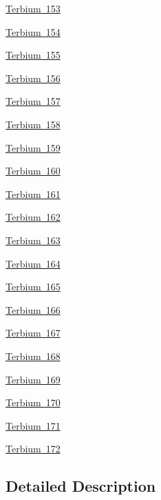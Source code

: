 \begin{DoxyCompactItemize}
\item 
\mbox{\hyperlink{group___isotope_const-_terbium-_tb153}{Terbium 153}}
\item 
\mbox{\hyperlink{group___isotope_const-_terbium-_tb154}{Terbium 154}}
\item 
\mbox{\hyperlink{group___isotope_const-_terbium-_tb155}{Terbium 155}}
\item 
\mbox{\hyperlink{group___isotope_const-_terbium-_tb156}{Terbium 156}}
\item 
\mbox{\hyperlink{group___isotope_const-_terbium-_tb157}{Terbium 157}}
\item 
\mbox{\hyperlink{group___isotope_const-_terbium-_tb158}{Terbium 158}}
\item 
\mbox{\hyperlink{group___isotope_const-_terbium-_tb159}{Terbium 159}}
\item 
\mbox{\hyperlink{group___isotope_const-_terbium-_tb160}{Terbium 160}}
\item 
\mbox{\hyperlink{group___isotope_const-_terbium-_tb161}{Terbium 161}}
\item 
\mbox{\hyperlink{group___isotope_const-_terbium-_tb162}{Terbium 162}}
\item 
\mbox{\hyperlink{group___isotope_const-_terbium-_tb163}{Terbium 163}}
\item 
\mbox{\hyperlink{group___isotope_const-_terbium-_tb164}{Terbium 164}}
\item 
\mbox{\hyperlink{group___isotope_const-_terbium-_tb165}{Terbium 165}}
\item 
\mbox{\hyperlink{group___isotope_const-_terbium-_tb166}{Terbium 166}}
\item 
\mbox{\hyperlink{group___isotope_const-_terbium-_tb167}{Terbium 167}}
\item 
\mbox{\hyperlink{group___isotope_const-_terbium-_tb168}{Terbium 168}}
\item 
\mbox{\hyperlink{group___isotope_const-_terbium-_tb169}{Terbium 169}}
\item 
\mbox{\hyperlink{group___isotope_const-_terbium-_tb170}{Terbium 170}}
\item 
\mbox{\hyperlink{group___isotope_const-_terbium-_tb171}{Terbium 171}}
\item 
\mbox{\hyperlink{group___isotope_const-_terbium-_tb172}{Terbium 172}}
\end{DoxyCompactItemize}


\subsection{Detailed Description}
